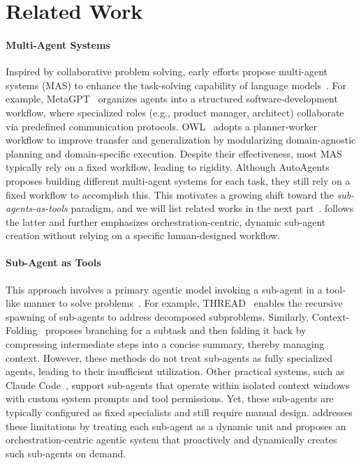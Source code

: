 \section{Related Work}
\paragraph{Multi-Agent Systems}
Inspired by collaborative problem solving, early efforts propose multi-agent systems (MAS) to enhance the task-solving capability of language models~\cite{zhang2025agentorchestra, DBLP:journals/corr/abs-2505-07437,wu2024autogen, shi2025aime, gao2025single, zhu2025oagents, fang2025cognitive, zhang2024aflow,DBLP:conf/icml/Li0FXC0L25}.
For example, MetaGPT~\cite{hong2023metagpt} organizes agents into a structured software-development workflow, where specialized roles (e.g., product manager, architect) collaborate via predefined communication protocols.
OWL~\cite{hu2025owl} adopts a planner-worker workflow to improve transfer and generalization by modularizing domain-agnostic planning and domain-specific execution.
Despite their effectiveness, most MAS typically rely on a fixed workflow, leading to rigidity.
Although AutoAgents~\cite{chen2023autoagents} proposes building different multi-agent systems for each task, they still rely on a fixed workflow to accomplish this.
This motivates a growing shift toward the \emph{sub-agents-as-tools} paradigm, and we will list related works in the next part~\cite{gao2025evolvesurvey, gao2025single}. 
\our{} follows the latter and further emphasizes orchestration-centric, dynamic sub-agent creation without relying on a specific human-designed workflow. 

\paragraph{Sub-Agent as Tools}
This approach involves a primary agentic model invoking a sub-agent in a tool-like manner to solve problems~\cite{li2025chain, su2025toolorchestra, grand2025self,DBLP:journals/tkde/LiuSLMJZFLTL25}. For example, THREAD~\cite{schroeder2025thread} enables the recursive spawning of sub-agents to address decomposed subproblems. Similarly, Context-Folding~\cite{sun2025scaling} proposes branching for a subtask and then folding it back by compressing intermediate steps into a concise summary, thereby managing context.
However, these methods do not treat sub-agents as fully specialized agents, leading to their insufficient utilization. 
Other practical systems, such as Claude Code~\cite{anthropic_claude_code_subagents}, support sub-agents that operate within isolated context windows with custom system prompts and tool permissions. Yet, these sub-agents are typically configured as fixed specialists and still require manual design.
\our{} addresses these limitations by treating each sub-agent as a dynamic unit and proposes an orchestration-centric agentic system that proactively and dynamically creates such sub-agents on demand.

